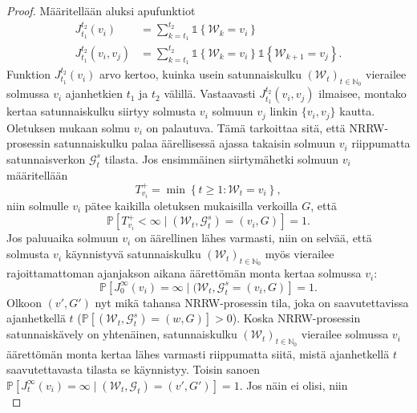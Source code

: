 \documentclass[finnish, 12pt, a4paper, sci, utf8, pdfa]{aaltothesis}
\newcommand{\N}{\mathbb{N}}
\newcommand{\Grandom}{\mathcal{G}}
\newcommand{\Wrandom}{\mathcal{W}}
\newcommand{\indicator}{\mathopen{\mathds{1}}}
\newcommand*{\prob}{\mathbb{P}}
\begin{document}
\begin{proof}
   Määritellään aluksi apufunktiot
   \begin{align*}
      J_{t_{1}}^{t_{2}}(v_{i})         &= \sum_{k = t_{1}}^{t_{2}} \indicator \left\{ \Wrandom_{k} = v_{i} \right\} \\
      J_{t_{1}}^{t_{2}}(v_{i}, v_{j})  &= \sum_{k = t_{1}}^{t_{2}} \indicator \left\{ \Wrandom_{k} = v_{i} \right\} \indicator \left\{ \Wrandom_{k+1} = v_{j} \right\}.
   \end{align*}
   Funktion $ J_{t_{1}}^{t_{2}}(v_{i}) $ arvo kertoo, kuinka usein satunnaiskulku $ (\Wrandom_{t})_{t \in \N_{0}} $ vierailee solmussa $ v_{i} $ ajanhetkien $ t_{1} $ ja $ t_{2} $ välillä.
   Vastaavasti $ J_{t_{1}}^{t_{2}}(v_{i}, v_{j}) $ ilmaisee, montako kertaa satunnaiskulku siirtyy solmusta $ v_{i} $ solmuun $ v_{j} $ linkin $ \{ v_{i}, v_{j} \} $ kautta.
   Oletuksen mukaan solmu $ v_{i} $ on palautuva. Tämä tarkoittaa sitä, että NRRW-prosessin satunnaiskulku palaa äärellisessä ajassa takaisin solmuun $ v_{i} $ riippumatta satunnaisverkon
   $ \Grandom_{t}^{s} $ tilasta. Jos ensimmäinen siirtymähetki solmuun $ v_{i} $ määritellään
   \[
      T_{v_{i}}^{+} = \min \left\{ t \geq 1 : \Wrandom_{t} = v_{i} \right\},
   \]
   niin solmulle $ v_{i} $ pätee kaikilla oletuksen mukaisilla verkoilla $ G $, että
   \[
      \prob \left[ T_{v_{i}}^{+} < \infty \mid (\Wrandom_{t}, \Grandom_{t}^{s}) = (v_{i}, G) \right] = 1.
   \]
   Jos paluuaika solmuun $ v_{i} $ on äärellinen lähes varmasti, niin on selvää, että solmusta $ v_{i} $ käynnistyvä satunnaiskulku $ (\Wrandom_{t})_{t \in \N_{0}} $ myös vierailee
   rajoittamattoman ajanjakson aikana äärettömän monta kertaa solmussa $ v_{i} $:
   \begin{equation}
      \prob \left[ J_{0}^{\infty}(v_{i}) = \infty \mid (\Wrandom_{t}, \Grandom_{t}^{s} = (v_{i}, G) \right] = 1.
      \label{equation:oletus}
   \end{equation}
   Olkoon $ (v', G') $ nyt mikä tahansa NRRW-prosessin tila, joka on saavutettavissa ajanhetkellä $ t $ ($ \prob \left[ (\Wrandom_{t}, \Grandom_{t}^{s}) = (w, G) \right] > 0 $).
   Koska NRRW-prosessin satunnaiskävely on yhtenäinen, satunnaiskulku $ (\Wrandom_{t})_{t \in \N_{0}} $ vierailee solmussa $ v_{i} $ äärettömän monta kertaa lähes varmasti riippumatta 
   siitä, mistä ajanhetkellä $ t $ saavutettavasta tilasta se käynnistyy. Toisin sanoen $ \prob \left[ J_{t}^{\infty}(v_{i}) = \infty \mid (\Wrandom_{t}, \Grandom_{t}) = (v', G') \right] = 1 $.
   Jos näin ei olisi, niin
   \begin{equation*}

\end{equation*}
\end{proof}
\end{document}
